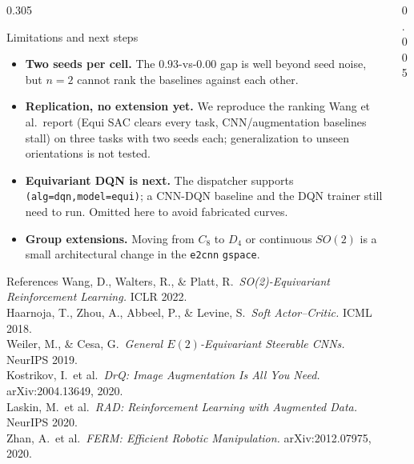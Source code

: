 \documentclass[final]{beamer}
\begin{document}
\begin{frame}[t]
\begin{columns}[t,totalwidth=\textwidth]
\begin{column}{0.305\textwidth}
\begin{block}{Limitations and next steps}
\small
\begin{itemize}
  \item \textbf{Two seeds per cell.} The $0.93$-vs-$0.00$ gap is well beyond seed noise, but $n{=}2$ cannot rank the baselines against each other.
  \item \textbf{Replication, no extension yet.} We reproduce the ranking Wang et al.\ report (Equi SAC clears every task, CNN/augmentation baselines stall) on three tasks with two seeds each; generalization to unseen orientations is not tested.
  \item \textbf{Equivariant DQN is next.} The dispatcher supports \texttt{(alg=dqn,model=equi)}; a CNN-DQN baseline and the DQN trainer still need to run. Omitted here to avoid fabricated curves.
  \item \textbf{Group extensions.} Moving from $C_{8}$ to $D_{4}$ or continuous $SO(2)$ is a small architectural change in the \texttt{e2cnn} \texttt{gspace}.
\end{itemize}
\end{block}

\begin{block}{References}
\scriptsize
Wang, D., Walters, R., \& Platt, R.\ \emph{SO(2)-Equivariant Reinforcement Learning.} ICLR 2022.\\[0.10em]
Haarnoja, T., Zhou, A., Abbeel, P., \& Levine, S.\ \emph{Soft Actor--Critic.} ICML 2018.\\[0.10em]
Weiler, M., \& Cesa, G.\ \emph{General $E(2)$-Equivariant Steerable CNNs.} NeurIPS 2019.\\[0.10em]
Kostrikov, I.\ et al.\ \emph{DrQ: Image Augmentation Is All You Need.} arXiv:2004.13649, 2020.\\[0.10em]
Laskin, M.\ et al.\ \emph{RAD: Reinforcement Learning with Augmented Data.} NeurIPS 2020.\\[0.10em]
Zhan, A.\ et al.\ \emph{FERM: Efficient Robotic Manipulation.} arXiv:2012.07975, 2020.
\end{block}

\end{column}

\begin{column}{0.005\textwidth}\end{column}

\end{columns}
\end{frame}
\end{document}
